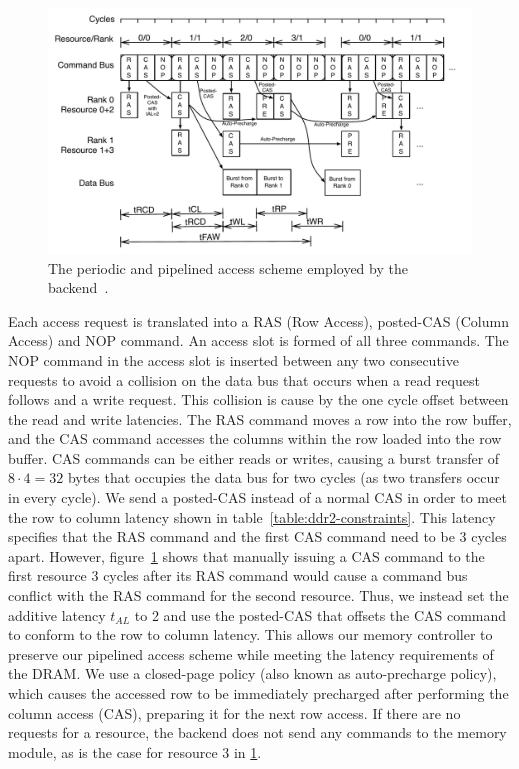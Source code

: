 \begin{figure}[h]
\begin{center}
\includegraphics[width=0.92\linewidth]{figs/backend}
\end{center} 
\caption{The periodic and pipelined access scheme employed by the backend~\cite{ReinekeLiuPatelKimLee11_PRETDRAMControllerBankPrivatizationForPredictability}.}
\label{fig:backend}
\end{figure}

Each access request is translated into a RAS (Row Access), posted-CAS (Column Access) and NOP command. 
An access slot is formed of all three commands.  
The NOP command in the access slot is inserted between any two consecutive requests to avoid a collision on the data bus that occurs when a read request follows and a write request.
This collision is cause by the one cycle offset between the read and write latencies. 
The RAS command moves a row into the row buffer, and the CAS command accesses the columns within the row loaded into the row buffer. 
CAS commands can be either reads or writes, causing a burst transfer of $8 \cdot 4 = 32$ bytes that occupies the data bus for two cycles (as two transfers occur in every cycle).
We send a posted-CAS instead of a normal CAS in order to meet the row to column latency shown in table~\ref{table:ddr2-constraints}.
This latency specifies that the RAS command and the first CAS command need to be 3 cycles apart.  
However, figure~\ref{fig:backend} shows that manually issuing a CAS command to the first resource 3 cycles after its RAS command would cause a command bus conflict with the RAS command for the second resource.
Thus, we instead set the additive latency $t_{AL}$ to 2 and use the posted-CAS that offsets the CAS command to conform to the row to column latency.
This allows our memory controller to preserve our pipelined access scheme while meeting the latency requirements of the DRAM.   
We use a closed-page policy (also known as auto-precharge policy), which causes the accessed row to be immediately precharged after performing the column access (CAS), preparing it for the next row access.
If there are no requests for a resource, the backend does not send any commands to the memory module, as is the case for resource 3 in \ref{fig:backend}.

